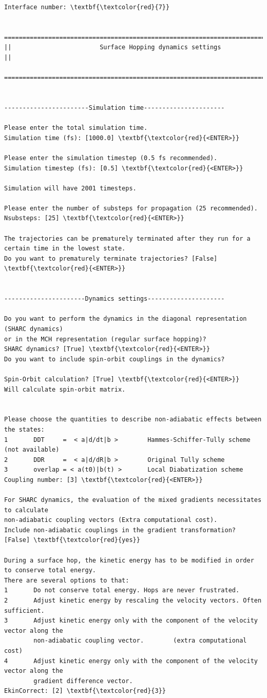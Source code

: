 \documentclass[a4paper,11pt,DIV=15,openany]{scrbook}
\begin{document}
\begin{oframed}
\begin{Verbatim}[commandchars=\\\{\}]
Interface number: \textbf{\textcolor{red}{7}}

  ================================================================================
||                        Surface Hopping dynamics settings                       ||
  ================================================================================


-----------------------Simulation time----------------------

Please enter the total simulation time.
Simulation time (fs): [1000.0] \textbf{\textcolor{red}{<ENTER>}}

Please enter the simulation timestep (0.5 fs recommended).
Simulation timestep (fs): [0.5] \textbf{\textcolor{red}{<ENTER>}}

Simulation will have 2001 timesteps.

Please enter the number of substeps for propagation (25 recommended).
Nsubsteps: [25] \textbf{\textcolor{red}{<ENTER>}}

The trajectories can be prematurely terminated after they run for a certain time in the lowest state. 
Do you want to prematurely terminate trajectories? [False] \textbf{\textcolor{red}{<ENTER>}}


----------------------Dynamics settings---------------------

Do you want to perform the dynamics in the diagonal representation (SHARC dynamics) 
or in the MCH representation (regular surface hopping)?
SHARC dynamics? [True] \textbf{\textcolor{red}{<ENTER>}}
Do you want to include spin-orbit couplings in the dynamics?

Spin-Orbit calculation? [True] \textbf{\textcolor{red}{<ENTER>}}
Will calculate spin-orbit matrix.


Please choose the quantities to describe non-adiabatic effects between the states:
1       DDT     =  < a|d/dt|b >        Hammes-Schiffer-Tully scheme   (not available)
2       DDR     =  < a|d/dR|b >        Original Tully scheme          
3       overlap = < a(t0)|b(t) >       Local Diabatization scheme     
Coupling number: [3] \textbf{\textcolor{red}{<ENTER>}}

For SHARC dynamics, the evaluation of the mixed gradients necessitates to calculate 
non-adiabatic coupling vectors (Extra computational cost).
Include non-adiabatic couplings in the gradient transformation? [False] \textbf{\textcolor{red}{yes}}

During a surface hop, the kinetic energy has to be modified in order to conserve total energy. 
There are several options to that:
1       Do not conserve total energy. Hops are never frustrated.
2       Adjust kinetic energy by rescaling the velocity vectors. Often sufficient.
3       Adjust kinetic energy only with the component of the velocity vector along the 
        non-adiabatic coupling vector.        (extra computational cost)
4       Adjust kinetic energy only with the component of the velocity vector along the 
        gradient difference vector.
EkinCorrect: [2] \textbf{\textcolor{red}{3}}


\end{Verbatim}
\end{oframed}
\end{document}
